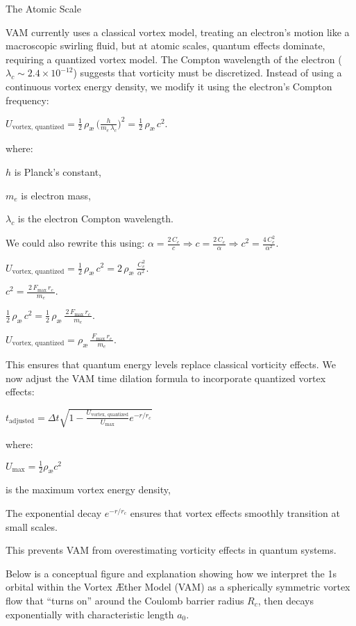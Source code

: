 The Atomic Scale

VAM currently uses a classical vortex model, treating an electron’s motion like a macroscopic swirling fluid, but at atomic scales, quantum effects dominate, requiring a quantized vortex model. The Compton wavelength of the electron ($\lambda_c \sim 2.4 \times 10^{-12}$) suggests that vorticity must be discretized. Instead of using a continuous vortex energy density, we modify it using the electron's Compton frequency:

$U_\text{vortex, quantized}= \tfrac12\,\rho_\text{\ae}\,\bigl(\tfrac{h}{m_e\,\lambda_c}\bigr)^2= \tfrac12\,\rho_\text{\ae}\,c^2.$

where:

$h$ is Planck’s constant,

$m_e$ is electron mass,

$\lambda_c$ is the electron Compton wavelength.

We could also rewrite this using: 
$\alpha= \tfrac{2\,C_e}{c}\Rightarrow c= \tfrac{2\,C_e}{\alpha}\Rightarrow c^2= \tfrac{4\,C_e^{2}}{\alpha^{2}}.$

$U_\text{vortex, quantized}= \tfrac12\,\rho_\text{\ae}\,c^2= 2\,\rho_\text{\ae}\,\frac{\,C_e^{2}}{\alpha^{2}}.$

$c^2= \frac{\,2\,F_{\max}\,r_c\,}{\,m_{e}\,}.$

$ \tfrac12\,\rho_\text{\ae}\,c^2= \tfrac12\,\rho_\text{\ae}\,\frac{\,2\,F_{\max}\,r_c\,}{\,m_{e}\,}.$

$U_\text{vortex, quantized}= \rho_\text{\ae}\,\frac{\,F_{\max}\,r_c\,}{\,m_{e}\,}.$

This ensures that quantum energy levels replace classical vorticity effects. We now adjust the VAM time dilation formula to incorporate quantized vortex effects:

$\boxed{t_\text{adjusted} = \Delta t \sqrt{1 - \frac{U_\text{vortex, quantized}}{U_\text{max}} e^{-r/r_c}}}$

where:

$U_\text{max} = \frac{1}{2} \rho_\text{\ae} c^2$

is the maximum vortex energy density,

The exponential decay $e^{-r/r_c}$ ensures that vortex effects smoothly transition at small scales.

This prevents VAM from overestimating vorticity effects in quantum systems.

Below is a conceptual figure and explanation showing how we interpret the 1s orbital within the Vortex Æther Model (VAM) as a spherically symmetric vortex flow that “turns on” around the Coulomb barrier radius \(R_c\), then decays exponentially with characteristic length \(a_0\).





